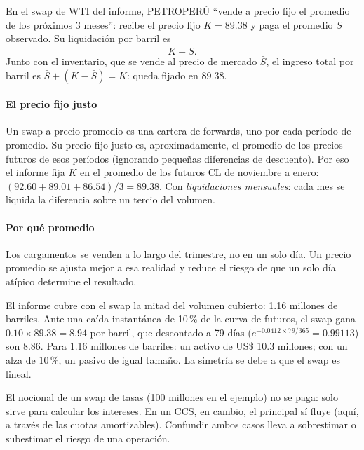 En el swap de WTI del informe, PETROPERÚ \enquote{vende a precio fijo el promedio de los próximos 3 meses}: recibe el precio fijo $K=89.38$ y paga el promedio $\bar S$ observado. Su liquidación por barril es
\[ K-\bar S. \]
Junto con el inventario, que se vende al precio de mercado $\bar S$, el ingreso total por barril es $\bar S+(K-\bar S)=K$: queda fijado en 89.38.

\paragraph{El precio fijo justo} Un swap a precio promedio es una cartera de forwards, uno por cada período de promedio. Su precio fijo justo es, aproximadamente, el promedio de los precios futuros de esos períodos (ignorando pequeñas diferencias de descuento). Por eso el informe fija $K$ en el promedio de los futuros CL de noviembre a enero: $(92.60+89.01+86.54)/3=89.38$. Con \emph{liquidaciones mensuales}: cada mes se liquida la diferencia sobre un tercio del volumen.

\paragraph{Por qué promedio} Los cargamentos se venden a lo largo del trimestre, no en un solo día. Un precio promedio se ajusta mejor a esa realidad y reduce el riesgo de que un solo día atípico determine el resultado.

\begin{informe}
El informe cubre con el swap la mitad del volumen cubierto: 1.16 millones de barriles. Ante una caída instantánea de 10\,\% de la curva de futuros, el swap gana $0.10\times89.38=8.94$ por barril, que descontado a 79 días ($e^{-0.0412\times79/365}=0.99113$) son 8.86. Para 1.16 millones de barriles: un activo de US\$ 10.3 millones; con un alza de 10\,\%, un pasivo de igual tamaño. La simetría se debe a que el swap es lineal.
\end{informe}

\begin{cuidado}
El nocional de un swap de tasas (100 millones en el ejemplo) no se paga: solo sirve para calcular los intereses. En un CCS, en cambio, el principal sí fluye (aquí, a través de las cuotas amortizables). Confundir ambos casos lleva a sobrestimar o subestimar el riesgo de una operación.
\end{cuidado}

